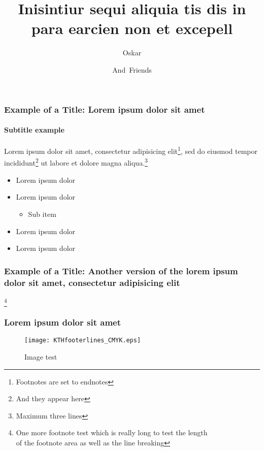 \documentclass[t]{beamer}
\title[Inisintiur sequi aliquia tis dis in para]
{%
  Inisintiur sequi aliquia tis dis in para earcien non et excepell%
}
\author[Oskar, Friends]
{
Oskar \and
And~Friends
}
\institute{}
\date{}
\begin{document}
\begin{frame}
\titlepage
\end{frame}


\begin{frame}
\frametitle{Example of a Title: Lorem ipsum dolor sit amet}
\framesubtitle{Subtitle example}

Lorem ipsum dolor sit amet, consectetur adipisicing elit\footnote{Footnotes are set to endnotes}, sed do eiusmod tempor incididunt\footnote{And they appear here} ut labore et dolore magna aliqua.\footnote{Maximum three lines}

\begin{itemize}
\item Lorem ipsum dolor
\item Lorem ipsum dolor
\begin{itemize}
\item Sub item
\end{itemize}
\item Lorem ipsum dolor
\item Lorem ipsum dolor
\end{itemize}


\footnoteblock{}

\end{frame}

\begin{frame}
\frametitle{Example of a Title: Another version of the lorem ipsum dolor sit amet, consectetur adipisicing elit}

\lipsum[2]\footnote{One more footnote test which is really long to test the length \\ of the footnote area as well as the line breaking}

\footnoteblock{}

\end{frame}


\begin{frame}
\frametitle{Lorem ipsum dolor sit amet}

\lipsum[4]

\begin{figure}[h!]
\texttt{[image: KTHfooterlines\_CMYK.eps]}
\caption{Image test}
\end{figure}


\end{frame}
\end{document}
